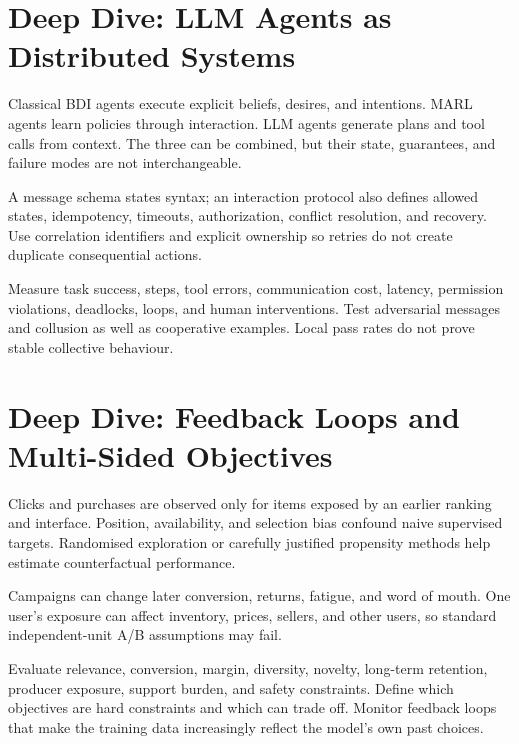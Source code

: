 \expandafter\def\csname almanachdeepdive@multi-agent-systems\endcsname{%
\section{Deep Dive: LLM Agents as Distributed Systems}
\begin{tcbitemize}[skin=sectionraster]
\tcbitem[title={Distinguish Three Agent Traditions},raster multicolumn=3]
Classical BDI agents execute explicit beliefs, desires, and intentions.
MARL agents learn policies through interaction.
LLM agents generate plans and tool calls from context.
The three can be combined, but their state, guarantees, and failure modes are
not interchangeable.

\tcbitem[title={Protocols Need Semantics},raster multicolumn=3]
A message schema states syntax; an interaction protocol also defines allowed
states, idempotency, timeouts, authorization, conflict resolution, and recovery.
Use correlation identifiers and explicit ownership so retries do not create
duplicate consequential actions.

\tcbitem[title={Evaluate Trajectories and Emergence},raster multicolumn=6]
Measure task success, steps, tool errors, communication cost, latency,
permission violations, deadlocks, loops, and human interventions.
Test adversarial messages and collusion as well as cooperative examples.
Local pass rates do not prove stable collective behaviour.
\end{tcbitemize}
}

\expandafter\def\csname almanachdeepdive@commerce-marketing\endcsname{%
\section{Deep Dive: Feedback Loops and Multi-Sided Objectives}
\begin{tcbitemize}[skin=sectionraster]
\tcbitem[title={Logged Data Reflects the Old Policy},raster multicolumn=3]
Clicks and purchases are observed only for items exposed by an earlier ranking
and interface.
Position, availability, and selection bias confound naive supervised targets.
Randomised exploration or carefully justified propensity methods help estimate
counterfactual performance.

\tcbitem[title={Delayed and Interfering Outcomes},raster multicolumn=3]
Campaigns can change later conversion, returns, fatigue, and word of mouth.
One user's exposure can affect inventory, prices, sellers, and other users, so
standard independent-unit A/B assumptions may fail.

\tcbitem[title={Balance the Marketplace},raster multicolumn=6]
Evaluate relevance, conversion, margin, diversity, novelty, long-term retention,
producer exposure, support burden, and safety constraints.
Define which objectives are hard constraints and which can trade off.
Monitor feedback loops that make the training data increasingly reflect the
model's own past choices.
\end{tcbitemize}
}


